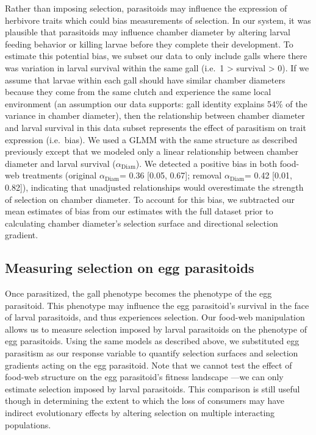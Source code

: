 \documentclass[11pt,]{article}
\begin{document}
Rather than imposing selection, parasitoids may influence the expression
of herbivore traits which could bias measurements of selection. In our
system, it was plausible that parasitoids may influence chamber diameter
by altering larval feeding behavior or killing larvae before they
complete their development. To estimate this potential bias, we subset
our data to only include galls where there was variation in larval
survival within the same gall (i.e.~1 \textgreater{} survival
\textgreater{} 0). If we assume that larvae within each gall should have
similar chamber diameters because they come from the same clutch and
experience the same local environment (an assumption our data supports:
gall identity explains 54\% of the variance in chamber diameter), then
the relationship between chamber diameter and larval survival in this
data subset represents the effect of parasitism on trait expression
(i.e.~bias). We used a GLMM with the same structure as described
previously except that we modeled only a linear relationship between
chamber diameter and larval survival (\(\alpha_{\text{Diam}}\)). We
detected a positive bias in both food-web treatments (original
\(\alpha_{\text{Diam}}\)= 0.36 {[}0.05, 0.67{]}; removal
\(\alpha_{\text{Diam}}\)= 0.42 {[}0.01, 0.82{]}), indicating that
unadjusted relationships would overestimate the strength of selection on
chamber diameter. To account for this bias, we subtracted our mean
estimates of bias from our estimates with the full dataset prior to
calculating chamber diameter's selection surface and directional
selection gradient.

\subsection{Measuring selection on egg
parasitoids}\label{measuring-selection-on-egg-parasitoids}

Once parasitized, the gall phenotype becomes the phenotype of the egg
parasitoid. This phenotype may influence the egg parasitoid's survival
in the face of larval parasitoids, and thus experiences selection. Our
food-web manipulation allows us to measure selection imposed by larval
parasitoids on the phenotype of egg parasitoids. Using the same models
as described above, we substituted egg parasitism as our response
variable to quantify selection surfaces and selection gradients acting
on the egg parasitoid. Note that we cannot test the effect of food-web
structure on the egg parasitoid's fitness landscape ---we can only
estimate selection imposed by larval parasitoids. This comparison is
still useful though in determining the extent to which the loss of
consumers may have indirect evolutionary effects by altering selection
on multiple interacting populations.
\end{document}
